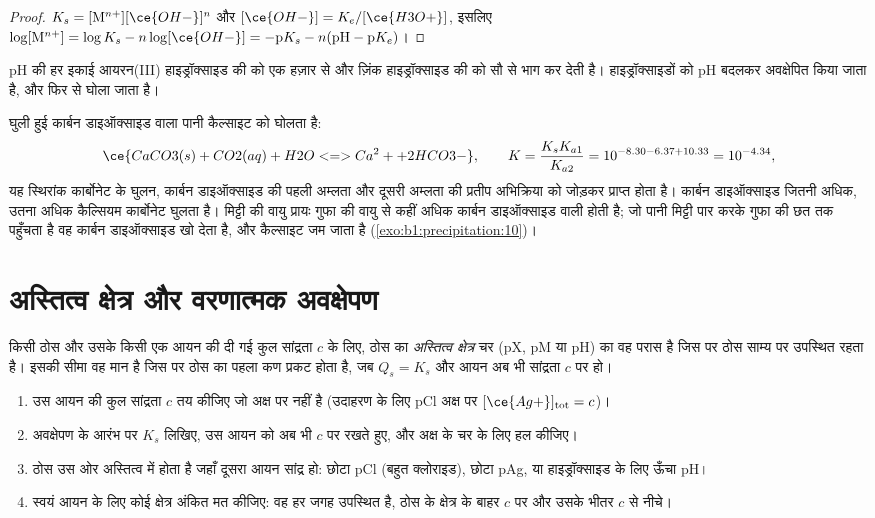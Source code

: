 \begin{proof}
$K_s = [\mathrm{M}^{n+}][\ce{OH-}]^n$ और $[\ce{OH-}] = K_e/[\ce{H3O+}]$,
इसलिए $\log[\mathrm{M}^{n+}] = \log K_s - n\log[\ce{OH-}] = -\mathrm{p}K_s -
n(\mathrm{pH} - \mathrm{p}K_e)$।
\end{proof}

pH की हर इकाई आयरन(III) हाइड्रॉक्साइड की  को एक
हज़ार से और ज़िंक हाइड्रॉक्साइड की  को सौ से भाग कर देती है। हाइड्रॉक्साइडों को
pH बदलकर अवक्षेपित किया जाता है, और फिर से घोला जाता है।

\begin{example}[कार्बन डाइऑक्साइड से कैल्सियम कार्बोनेट घोलना]\label{ex:b1:precipitation:cave}
घुली हुई कार्बन डाइऑक्साइड वाला पानी कैल्साइट को घोलता है:
\[
  \ce{CaCO3(s) + CO2(aq) + H2O <=> Ca^2+ + 2HCO3-}, \qquad
  K = \frac{K_s K_{a1}}{K_{a2}} = 10^{-8.30 - 6.37 + 10.33} = 10^{-4.34} ,
\]
यह स्थिरांक कार्बोनेट के घुलन,
कार्बन डाइऑक्साइड की पहली अम्लता और दूसरी अम्लता की प्रतीप अभिक्रिया को जोड़कर प्राप्त होता है।
कार्बन डाइऑक्साइड जितनी अधिक, उतना अधिक कैल्सियम कार्बोनेट घुलता है। मिट्टी की वायु प्रायः
गुफा की वायु से कहीं अधिक कार्बन डाइऑक्साइड वाली होती है; जो पानी
मिट्टी पार करके गुफा की छत तक पहुँचता है वह कार्बन डाइऑक्साइड खो देता है, और
कैल्साइट जम जाता है (\cref{exo:b1:precipitation:10})।
\end{example}

\section{अस्तित्व क्षेत्र और वरणात्मक अवक्षेपण}\label{sec:b1:precipitation:domains}

\begin{definition}[अस्तित्व क्षेत्र]\label{def:b1:precipitation:existence-domain}
किसी ठोस और उसके किसी एक आयन की दी गई कुल सांद्रता $c$ के लिए, ठोस का
\emph{अस्तित्व क्षेत्र} चर (pX, pM या pH) का वह
परास है जिस पर ठोस साम्य पर उपस्थित रहता है। इसकी सीमा वह मान है जिस पर ठोस का
पहला कण प्रकट होता है, जब $Q_s = K_s$ और आयन अब भी सांद्रता $c$ पर हो।
\end{definition}

\begin{method}[अस्तित्व आरेख बनाना]\label{met:b1:precipitation:existence-domain}
\begin{enumerate}
  \item उस आयन की कुल सांद्रता $c$ तय कीजिए जो अक्ष पर नहीं है
        (उदाहरण के लिए pCl अक्ष पर $[\ce{Ag+}]_{\mathrm{tot}} = c$)।
  \item अवक्षेपण के आरंभ पर $K_s$ लिखिए, उस आयन को अब भी
        $c$ पर रखते हुए, और अक्ष के चर के लिए हल कीजिए।
  \item ठोस उस ओर अस्तित्व में होता है जहाँ दूसरा आयन
        सांद्र हो: छोटा pCl (बहुत क्लोराइड), छोटा pAg, या हाइड्रॉक्साइड के लिए
        ऊँचा pH।
  \item स्वयं आयन के लिए कोई क्षेत्र अंकित मत कीजिए: वह
        हर जगह उपस्थित है, ठोस के क्षेत्र के बाहर $c$ पर और उसके भीतर $c$ से
        नीचे।
\end{enumerate}
\end{method}

